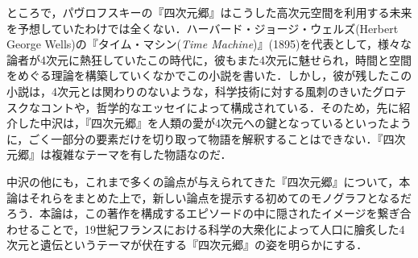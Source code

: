 ところで，パヴロフスキーの『四次元郷』はこうした高次元空間を利用する未来を予想していたわけでは全くない．ハーバード・ジョージ・ウェルズ(Herbert George Wells)の『タイム・マシン(\emph{Time Machine})』(1895)を代表として，様々な論者が4次元に熱狂していたこの時代に，彼もまた4次元に魅せられ，時間と空間をめぐる理論を構築していくなかでこの小説を書いた．しかし，彼が残したこの小説は，4次元とは関わりのないような，科学技術に対する風刺のきいたグロテスクなコントや，哲学的なエッセイによって構成されている．そのため，先に紹介した中沢は，『四次元郷』を人類の愛が4次元への鍵となっているといったように，ごく一部分の要素だけを切り取って物語を解釈することはできない．『四次元郷』は複雑なテーマを有した物語なのだ．

中沢の他にも，これまで多くの論点が与えられてきた『四次元郷』について，本論はそれらをまとめた上で，新しい論点を提示する初めてのモノグラフとなるだろう．本論は，この著作を構成するエピソードの中に隠されたイメージを繋ぎ合わせることで，19世紀フランスにおける科学の大衆化によって人口に膾炙した4次元と遺伝というテーマが伏在する『四次元郷』の姿を明らかにする．
